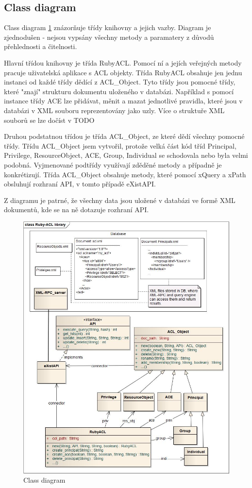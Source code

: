 \subsection{Class diagram}
Class diagram \ref{fig:Class diagram} znázorňuje třídy knihovny a jejich vazby. Diagram je zjednodušen - nejsou vypsány všechny metody a paramatery z důvodů přehlednosti a čitelnosti. 

Hlavní třídou knihovny je třída RubyACL. Pomocí ní a jejích veřejných metody pracuje uživatelská aplikace s ACL objekty. Třída RubyACL obsahuje jen jednu instanci od každé třídy dědící z ACL\_Object. Tyto třídy jsou pomocné třídy, které "znají" strukturu dokumentu uloženého v databázi. Například s pomocí instance třídy ACE lze přidávat, měnit a mazat jednotlivé pravidla, které jsou v databázi v XML souboru reprezentovány jako uzly. Více o struktuře XML souborů se lze dočíst v TODO

Druhou podstatnou třídou je třída ACL\_Object, ze které dědí všechny pomocné třídy. Třídu ACL\_Object jsem vytvořil, protože velká část kód tříd Principal, Privilege, ResourceObject, ACE, Group, Individual se schodovala nebo byla velmi podobná. Vyjmenované podtřídy využívají zděděné metody a případně je konkrétizují.
Třída ACL\_Object obsahuje metody, které pomocí xQuery a xPath obsluhují rozhraní API, v tomto případě eXistAPI.

Z diagramu je patrné, že všechny data jsou uložené v databázi ve formě XML dokumentů, kde se na ně dotazuje rozhraní API.

\begin{figure}
\includegraphics[width=15cm]{Ruby-ACL.jpg}
\caption{Class diagram}
\label{fig:Class diagram}
\end{figure}


